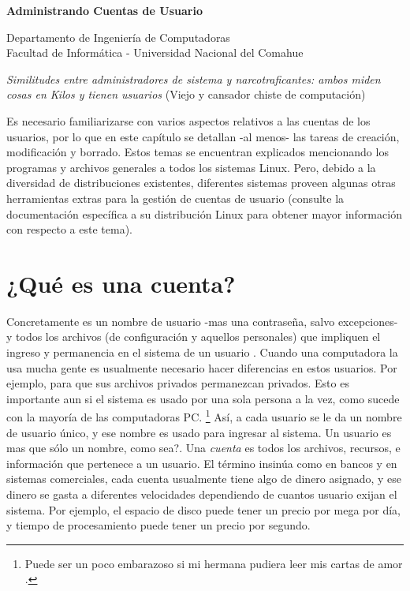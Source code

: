 \documentclass[12pt]{article}
\def\maketitle{

 \makeatletter
 {\color{bl} \centering \huge \sc \textbf{
Administrando Cuentas de Usuario \\
 \vspace*{8pt} }\par}
 \makeatother


 \makeatletter
 {\centering \small 
 	Departamento de Ingeniería de Computadoras \\
 	Facultad de Informática - Universidad Nacional del Comahue \\
 	\vspace{20pt} }
 \makeatother

}
\begin{document}
\thispagestyle{empty}
\maketitle
\setlength{\parindent}{0pt}




\textit{Similitudes entre administradores de sistema y
narcotraficantes: ambos miden cosas en Kilos y tienen usuarios} (Viejo y
cansador chiste de computación)

Es necesario familiarizarse con varios aspectos relativos a las
cuentas de los usuarios, por lo que en este capítulo se detallan 
-al menos- las tareas de creación, modificación y borrado.
Estos temas se encuentran explicados
mencionando los programas y archivos generales a todos los sistemas Linux.
Pero, debido a la diversidad de distribuciones existentes,
diferentes sistemas proveen algunas otras herramientas extras para la gestión de cuentas de usuario (consulte la documentación
específica a su distribución Linux para obtener mayor información con 
respecto a este tema).

		
\section{ ¿Qué es una cuenta?}

Concretamente es un nombre de usuario -mas una contraseña, salvo
excepciones- y todos los archivos (de configuración y aquellos personales) que
impliquen el ingreso y permanencia en el sistema  de un usuario .
Cuando una computadora la usa mucha gente es usualmente necesario hacer
diferencias en estos usuarios. Por ejemplo, para que sus archivos privados
permanezcan privados. Esto es importante aun si el sistema es usado por una
sola persona a la vez, como sucede con la mayoría de las computadoras PC.
		\footnote{
 Puede ser un poco embarazoso si mi hermana pudiera leer mis cartas de amor
		.} Así, a cada
		usuario se le da un nombre de usuario único, y ese nombre es
		usado para ingresar al sistema. Un usuario es mas
		que sólo un nombre, como sea?. Una \textit{cuenta}
		es todos los archivos, recursos, e información que pertenece a
		un usuario. El término insinúa como en bancos y en sistemas
		comerciales, cada cuenta usualmente tiene algo de dinero
		asignado, y ese dinero se gasta a diferentes velocidades
		dependiendo de cuantos usuario exijan el sistema. Por ejemplo,
		el espacio de disco puede tener un precio por mega por día, y
		tiempo de procesamiento puede tener un precio por
		segundo.
\end{document}
